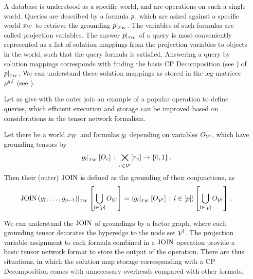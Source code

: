 
A database is understood as a specific \firstOrderLogic{} world, and are operations on such a single world.
Queries are described by a formula $p$, which are asked against a specific world $x_{W}$ to retrieve the grounding ${p}|_{x_{W}}$.
The variables of such formulas are called projection variables.
The answer ${p}|_{x_{W}}$ of a query is most conveniently represented as a list of solution mappings from the projection variables to objects in the world, such that the query formula is satisfied.
Answering a query by solution mappings corresponds with finding the basis CP Decomposition (see ) of ${p}|_{x_{W}}$.
We can understand these solution mappings as stored in the leg-matrices $\rho^{q,l}$ (see ).

Let us give with the outer join an example of a popular operation to define queries, which efficient execution and storage can be improved based on considerations in the tensor network formalism.

\begin{definition}
    Let there be a world $x_{W}$ and formulas $g_{l}$ depending on variables $O_{\mathcal{V}^{l}}$, which have grounding tensors by
    \begin{align*}
        {g_{l}}|_{x_{W}} \left[O_{v}\right] \, : \,  \bigtimes_{v\in\mathcal{V}^{l}}[r_{v}] \rightarrow \{0,1\} \, .
    \end{align*}
    Then their (outer) $\mathrm{JOIN}$ is defined as the grounding of their conjunctions, as
    \begin{align*}
        {\mathrm{JOIN}\left(g_{0},\ldots,g_{p-1}\right)}|_{x_{W}} \left[\bigcup_{l\in[p]}O_{\mathcal{V}^{l}}\right]
        = \left\langle {g_{l}}|_{x_{W}} \left[O_{\mathcal{V}^{l}}\right]\,:\,l\in[p]\right\rangle \left[ \bigcup_{l\in[p]}O_{\mathcal{V}^{l}} \right] \, .
    \end{align*}
\end{definition}

We can understand the $\mathrm{JOIN}$ of groundings by a factor graph, where each grounding tensor decorates the hyperedge to the node set $\mathcal{V}^{l}$.
The projection variable assignment to each formula combined in a $\mathrm{JOIN}$ operation provide a basic tensor network format to store the output of the operation.
There are thus situations, in which the solution map storage corresponding with a CP Decomposition comes with unnecessary overheads compared with other formats.

